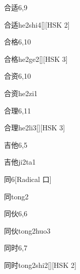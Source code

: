 \begin{entry}{合适}{6,9}
  \begin{phonetics}{合适}{he2shi4}[][HSK 2]
  \end{phonetics}
\end{entry}

\begin{entry}{合格}{6,10}
  \begin{phonetics}{合格}{he2ge2}[][HSK 3]
  \end{phonetics}
\end{entry}

\begin{entry}{合资}{6,10}
  \begin{phonetics}{合资}{he2zi1}
  \end{phonetics}
\end{entry}

\begin{entry}{合理}{6,11}
  \begin{phonetics}{合理}{he2li3}[][HSK 3]
  \end{phonetics}
\end{entry}

\begin{entry}{吉他}{6,5}
  \begin{phonetics}{吉他}{ji2ta1}
  \end{phonetics}
\end{entry}

\begin{entry}{同}{6}[Radical 口]
  \begin{phonetics}{同}{tong2}
  \end{phonetics}
\end{entry}

\begin{entry}{同伙}{6,6}
  \begin{phonetics}{同伙}{tong2huo3}
  \end{phonetics}
\end{entry}

\begin{entry}{同时}{6,7}
  \begin{phonetics}{同时}{tong2shi2}[][HSK 2]
  \end{phonetics}
\end{entry}

